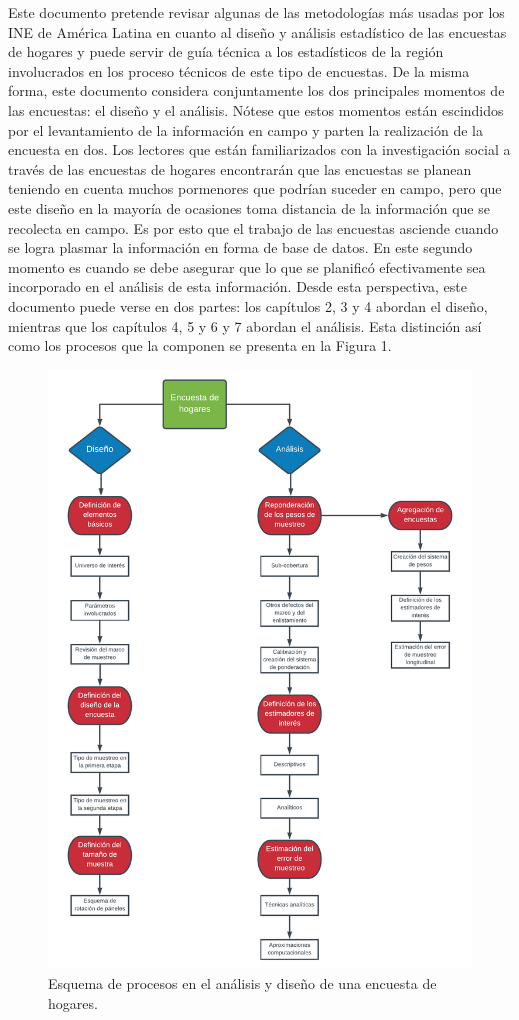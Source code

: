\documentclass[12pt,spanish,]{book}
\begin{document}
Este documento pretende revisar algunas de las metodologías más usadas por los INE de América Latina en cuanto al diseño y análisis estadístico de las encuestas de hogares y puede servir de guía técnica a los estadísticos de la región involucrados en los proceso técnicos de este tipo de encuestas. De la misma forma, este documento considera conjuntamente los dos principales momentos de las encuestas: el diseño y el análisis. Nótese que estos momentos están escindidos por el levantamiento de la información en campo y parten la realización de la encuesta en dos. Los lectores que están familiarizados con la investigación social a través de las encuestas de hogares encontrarán que las encuestas se planean teniendo en cuenta muchos pormenores que podrían suceder en campo, pero que este diseño en la mayoría de ocasiones toma distancia de la información que se recolecta en campo. Es por esto que el trabajo de las encuestas asciende cuando se logra plasmar la información en forma de base de datos. En este segundo momento es cuando se debe asegurar que lo que se planificó efectivamente sea incorporado en el análisis de esta información. Desde esta perspectiva, este documento puede verse en dos partes: los capítulos 2, 3 y 4 abordan el diseño, mientras que los capítulos 4, 5 y 6 y 7 abordan el análisis. Esta distinción así como los procesos que la componen se presenta en la Figura 1.

\begin{figure}
\centering
\includegraphics{Pics/1.pdf}
\caption{Esquema de procesos en el análisis y diseño de una encuesta de hogares.}
\end{figure}
\end{document}
